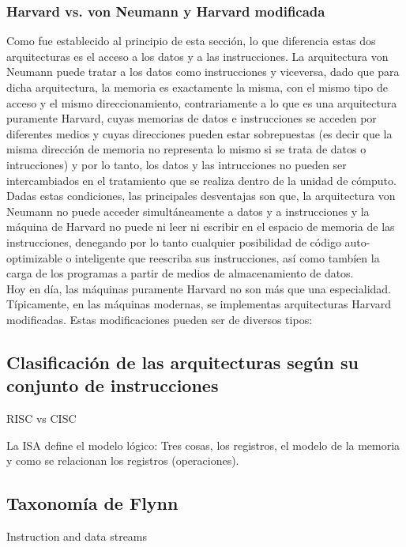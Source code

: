 \subsubsection{Harvard vs. von Neumann y Harvard modificada}

Como fue establecido al principio de esta sección, lo que diferencia estas dos arquitecturas es el acceso a los datos y a las instrucciones. La arquitectura von Neumann puede tratar a los datos como instrucciones y viceversa, dado que para dicha arquitectura, la memoria es exactamente la misma, con el mismo tipo de acceso y el mismo direccionamiento, contrariamente a lo que es una arquitectura puramente Harvard, cuyas memorias de datos e instrucciones se acceden por diferentes medios y cuyas direcciones pueden estar sobrepuestas (es decir que la misma dirección de memoria no representa lo mismo si se trata de datos o intrucciones) y por lo tanto, los datos y las intrucciones no pueden ser intercambiados en el tratamiento que se realiza dentro de la unidad de cómputo. Dadas estas condiciones, las principales desventajas son que, la arquitectura von Neumann no puede acceder simultáneamente a datos y a instrucciones y la máquina de Harvard no puede ni leer ni escribir en el espacio de memoria de las instrucciones, denegando por lo tanto cualquier posibilidad de código auto-optimizable o inteligente que reescriba sus instrucciones, así como tambíen la carga de los programas a partir de medios de almacenamiento de datos.\\
Hoy en día, las máquinas puramente Harvard no son más que una especialidad. Típicamente, en las máquinas modernas, se implementas arquitecturas Harvard modificadas. Estas modificaciones pueden ser de diversos tipos:

\subsection{Clasificación de las arquitecturas según su conjunto de instrucciones}

RISC vs CISC

La ISA define el modelo lógico: Tres cosas, los registros, el modelo de la memoria y como se relacionan los registros (operaciones).

\subsection{Taxonomía de Flynn}

Instruction and data streams


